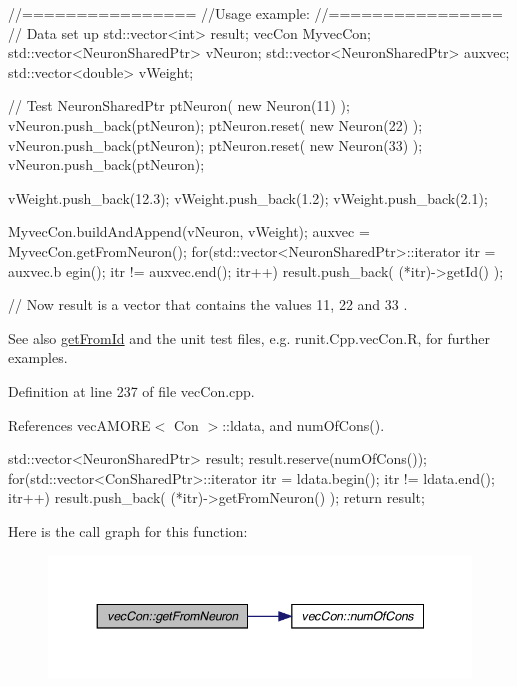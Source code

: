 \begin{DoxyCode}
        //================
        //Usage example:
        //================
        // Data set up
        std::vector<int> result;
                        vecCon MyvecCon;
                        std::vector<NeuronSharedPtr> vNeuron;
                        std::vector<NeuronSharedPtr> auxvec;
                        std::vector<double> vWeight;

                        // Test
                        NeuronSharedPtr ptNeuron( new Neuron(11) );
                        vNeuron.push_back(ptNeuron);
                        ptNeuron.reset( new Neuron(22) );
                        vNeuron.push_back(ptNeuron);
                        ptNeuron.reset( new Neuron(33) );
                        vNeuron.push_back(ptNeuron);

                        vWeight.push_back(12.3);
                        vWeight.push_back(1.2);
                        vWeight.push_back(2.1);

                        MyvecCon.buildAndAppend(vNeuron, vWeight);
                        auxvec = MyvecCon.getFromNeuron();
                        for(std::vector<NeuronSharedPtr>::iterator itr = auxvec.b
      egin();   itr != auxvec.end();   itr++) { result.push_back( (*itr)->getId() ); }


        // Now result is a vector that contains the values 11, 22 and 33 .
\end{DoxyCode}


\begin{DoxySeeAlso}{See also}
\hyperlink{classvec_con_aa9f3f5df4c4060951c975c4c829b8471}{getFromId} and the unit test files, e.g. runit.Cpp.vecCon.R, for further examples. 
\end{DoxySeeAlso}


Definition at line 237 of file vecCon.cpp.



References vecAMORE$<$ Con $>$::ldata, and numOfCons().


\begin{DoxyCode}
                                                    {
        std::vector<NeuronSharedPtr> result;
        result.reserve(numOfCons());
        for(std::vector<ConSharedPtr>::iterator itr = ldata.begin();   itr != 
      ldata.end();   itr++)   { result.push_back( (*itr)->getFromNeuron() ); }
        return result;
}
\end{DoxyCode}


Here is the call graph for this function:\nopagebreak
\begin{figure}[H]
\begin{center}
\leavevmode
\includegraphics[width=348pt]{classvec_con_ae72d00aedcd054e690f1dcf2ca5ac2c2_cgraph}
\end{center}
\end{figure}


